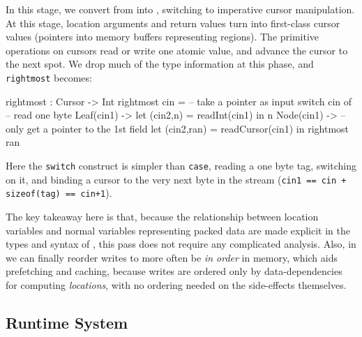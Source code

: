 \documentclass[showabstract,showacknowledgments,showpreface,showdedication]{iuphd}
\theoremstyle{nonumberplain}
\newcommand{\il}[1]{\lstinline[style=inline,mathescape=true];#1;}
\begin{document}
In this stage, we convert from \ourcalc{} into \lamcur{}, switching to
imperative cursor manipulation.
%
At this stage, location arguments and return values turn into first-class cursor
values (pointers into memory buffers representing regions).  The primitive
operations on cursors read or write one atomic value, and advance the cursor to
the next spot.  We drop much of the type information at this phase, and
\il{rightmost} becomes:
\begin{code}
rightmost : Cursor -> Int
rightmost cin =   -- take a pointer as input 
  switch cin of   -- read one byte
    Leaf(cin1)  -> 
      let (cin2,n) = readInt(cin1) in n
    Node(cin1)  -> -- only get a pointer to the 1st field
      let (cin2,ran) = readCursor(cin1) in
      rightmost ran
\end{code}\vspace{-1mm}
%
Here the \il{switch} construct is simpler than \il{case},
reading a one byte tag, switching on
it, and binding a cursor to the very next byte in the stream
(\il{cin1 == cin + sizeof(tag) == cin+1}).

%
The key takeaway here is that, because the relationship between
location variables and normal variables representing packed data are
made explicit in the types and syntax of \ourcalc{}, this pass
does not require any complicated analysis.
%
Also, in \lamcur{} we can finally reorder writes to more often be {\em in order}
in memory, which aids prefetching and caching,
because writes are ordered only by
data-dependencies for computing \emph{locations}, with no ordering needed
on the side-effects themselves.

\subsection{Runtime System}\label{subsec:rts}
\end{document}

